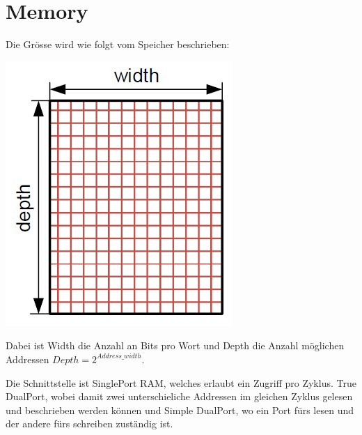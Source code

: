 \section{Memory}
Die Grösse wird wie folgt vom Speicher beschrieben:
\begin{center}
	\includegraphics[width=0.7\columnwidth]{Images/memory}
\end{center}
Dabei ist Width die Anzahl an Bits pro Wort und Depth die Anzahl möglichen Addressen $Depth=2^{Address\_width}$. 

Die Schnittstelle ist SinglePort RAM, welches erlaubt ein Zugriff pro Zyklus. True DualPort, wobei damit zwei unterschieliche Addressen im gleichen Zyklus gelesen und beschrieben werden können und Simple DualPort, wo ein Port fürs lesen und der andere fürs schreiben zuständig ist.

